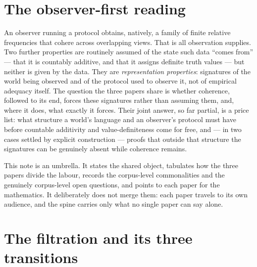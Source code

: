 \section{The observer-first reading}\label{sec:moral}

An observer running a protocol obtains, natively, a family of finite relative
frequencies that cohere across overlapping views. That is all observation
supplies. Two further properties are routinely assumed of the state such data
``comes from'' --- that it is countably additive, and that it assigns definite
truth values --- but neither is given by the data. They are \emph{representation
properties}: signatures of the world being observed and of the protocol used to
observe it, not of empirical adequacy itself. The question the three papers share
is whether coherence, followed to its end, forces these signatures rather than
assuming them, and, where it does, what exactly it forces. Their joint answer, so
far partial, is a price list: what structure a world's language
and an observer's protocol must have before countable additivity and
value-definiteness come for free, and --- in two cases settled by explicit
construction --- proofs that outside that structure the signatures can be
genuinely absent while coherence remains.

This note is an umbrella. It states the shared object, tabulates how the three
papers divide the labour, records the corpus-level commonalities and the
genuinely corpus-level open questions, and points to each paper for the
mathematics. It deliberately does not merge them: each paper travels to its own
audience, and the spine carries only what no single paper can say alone.


\section{The filtration and its three transitions}\label{sec:filtration}

